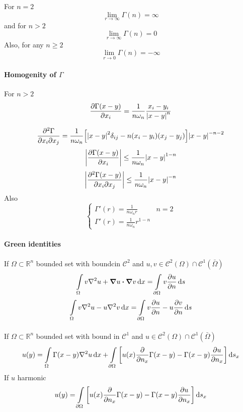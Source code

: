 For $n=2$
$$\lim_{r\to \infty}\Gamma(n) = \infty $$
and for $n>2$
$$\lim_{r\to \infty}\Gamma(n) = 0 $$
Also, for any $n\geq 2$
$$\lim_{r\to 0} \Gamma(n) = -\infty$$

\paragraph{Homogenity of $\Gamma$}
For $n>2$
$$\pdv{\Gamma(x-y)}{x_i} = \frac{1}{n\omega_n} \frac{x_i-y_i}{\abs{ x-y}^n} $$

$$\pdv{\Gamma}{x_i}{x_j} = \frac{1}{n\omega_n} \qty[\abs{x-y}^2 \delta_{ij} - n(x_i-y_i)(x_j-y_j)] \abs{x-y}^{-n-2}$$
$$\abs{\pdv{\Gamma(x-y)}{x_i}} \leq \frac{1}{n\omega_n} \abs{x-y}^{1-n}$$
$$\abs{\pdv{\Gamma(x-y)}{x_i}{x_j}} \leq \frac{1}{n\omega_n} \abs{x-y}^{-n}$$
	Also
$$\begin{cases}
\Gamma'(r) = \frac{1}{n\omega_n r}& n=2\\
\Gamma'(r) = \frac{1}{n\omega_n} r^{1-n}
\end{cases}$$
\paragraph{Green identities}
If $\Omega \subset \mathbb{R}^n$ bounded set with boundcin $\mathcal{C}^2$ and
$u,v \in \mathcal{C}^2(\Omega) \cap \mathcal{C}^1(\bar{\Omega})$
$$\int\limits_{\Omega} v\laplacian{u} + \grad{u} \vdot \grad{v}  \dd{x} = \int\limits_{\partial \Omega} v \pdv{u}{n} \dd{s} $$
$$\int\limits_{\Omega} v\laplacian{u} - u \laplacian{v} \dd{x} = \int\limits_{\partial \Omega} v \pdv{u}{n} - u \pdv{v}{n} \dd{s} $$
\paragraph{}
If $\Omega \subset \mathbb{R}^n$ bounded set with bound in $\mathcal{C}^1$ and
$u \in \mathcal{C}^2(\Omega) \cap \mathcal{C}^1(\bar{\Omega})$
$$u(y) = \int\limits_{\Omega} \Gamma(x-y) \laplacian{u} \dd{x} + \int\limits_{\partial \Omega} \qty[u(x) \pdv{n_x}\Gamma(x-y) - \Gamma(x-y) \pdv{u}{n_x}] \dd{s_x} $$
If $u$ harmonic
$$u(y) =  \int\limits_{\partial \Omega} \qty[u(x) \pdv{n_x}\Gamma(x-y) - \Gamma(x-y) \pdv{u}{n_x}] \dd{s_x} $$

